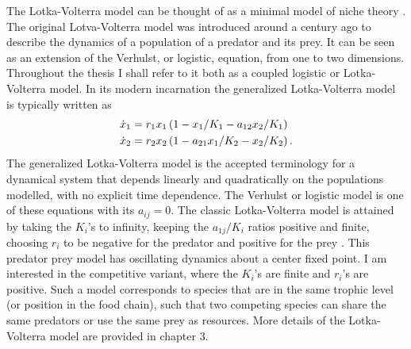 The Lotka-Volterra model can be thought of as a minimal model of niche theory \cite{Haegeman2011}. 
The original Lotva-Volterra model was introduced around a century ago to describe the dynamics of a population of a predator and its prey.
It can be seen as an extension of the Verhulst, or logistic, equation, from one to two dimensions. %
Throughout the thesis I shall refer to it both as a coupled logistic or Lotka-Volterra model. 
In its modern incarnation the generalized Lotka-Volterra model is typically written as 
\begin{align}
\dot{x}_1 &= r_1 x_1 \left(1 - x_1/K_1 - a_{12}x_2/K_1\right) \label{LVeqns} \\
\dot{x}_2 &= r_2 x_2 \left(1 - a_{21}x_1/K_2 - x_2/K_2\right). \notag
\end{align}
The generalized Lotka-Volterra model is the accepted terminology for a dynamical system that depends linearly and quadratically on the populations modelled, with no explicit time dependence. 
The Verhulst or logistic model is one of these equations with its $a_{ij}=0$. 
The classic Lotka-Volterra model is attained by taking the $K_i$'s to infinity, keeping the $a_{1j}/K_i$ ratios positive and finite, choosing $r_i$ to be negative for the predator and positive for the prey \cite{Lokta1920,Volterra1926}. 
This predator prey model has oscillating dynamics about a center fixed point. 
I am interested in the competitive variant, where the $K_i$'s are finite and $r_i$'s are positive. 
Such a model corresponds to species that are in the same trophic level (or position in the food chain), such that two competing species can share the same predators or use the same prey as resources. 
More details of the Lotka-Volterra model are provided in chapter 3. 
